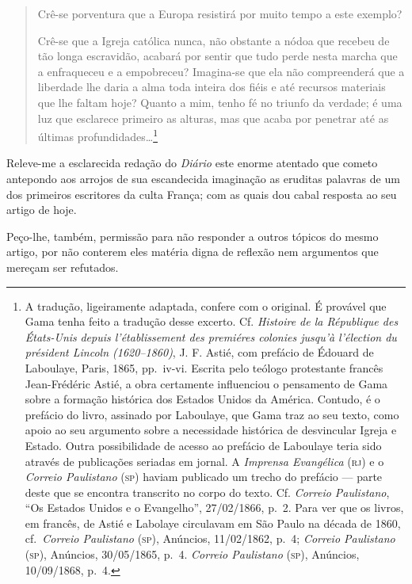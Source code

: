 \begin{quote}
Crê-se porventura que a Europa resistirá por muito tempo a este exemplo?

Crê-se que a Igreja católica nunca, não obstante a nódoa que recebeu de
tão longa escravidão, acabará por sentir que tudo perde nesta marcha que
a enfraqueceu e a empobreceu? Imagina-se que ela não compreenderá que a
liberdade lhe daria a alma toda inteira dos fiéis e até recursos
materiais que lhe faltam hoje? Quanto a mim, tenho fé no triunfo da
verdade; é uma luz que esclarece primeiro as alturas, mas que acaba por
penetrar até as últimas profundidades\ldots{}\footnote{A tradução,
  ligeiramente adaptada, confere com o original. É provável que Gama
  tenha feito a tradução desse excerto. Cf. \emph{Histoire de la
  République des États-Unis} \emph{depuis l'établissement des premiéres
  colonies jusqu'à l'élection du président Lincoln (1620--1860)}, J. F.
  Astié, com prefácio de Édouard de Laboulaye, Paris, 1865, pp.~iv-vi.
  Escrita pelo teólogo protestante francês Jean-Frédéric Astié, a obra
  certamente influenciou o pensamento de Gama sobre a formação histórica
  dos Estados Unidos da América. Contudo, é o prefácio do livro,
  assinado por Laboulaye, que Gama traz ao seu texto, como apoio ao seu
  argumento sobre a necessidade histórica de desvincular Igreja e
  Estado. Outra possibilidade de acesso ao prefácio de Laboulaye teria
  sido através de publicações seriadas em jornal. A \emph{Imprensa
  Evangélica} (\textsc{rj}) e o \emph{Correio Paulistano} (\textsc{sp}) haviam publicado
  um trecho do prefácio --- parte deste que se encontra transcrito no
  corpo do texto. Cf. \emph{Correio Paulistano}, ``Os Estados Unidos e o Evangelho'', 27/02/1866, p.~2. Para ver que os livros,
  em francês, de Astié e Labolaye circulavam em São Paulo na década de
  1860, cf.~\emph{Correio Paulistano} (\textsc{sp}), Anúncios, 11/02/1862, p.~4;
 \emph{Correio Paulistano} (\textsc{sp}), Anúncios, 30/05/1865, p.~4.
  \emph{Correio Paulistano} (\textsc{sp}), Anúncios, 10/09/1868, p.~4.}
\end{quote}

Releve-me a esclarecida redação do \emph{Diário} este enorme atentado
que cometo antepondo aos arrojos de sua escandecida imaginação as
eruditas palavras de um dos primeiros escritores da culta França; com as
quais dou cabal resposta ao seu artigo de hoje.

Peço-lhe, também, permissão para não responder a outros tópicos do mesmo
artigo, por não conterem eles matéria digna de reflexão nem argumentos
que mereçam ser refutados.

